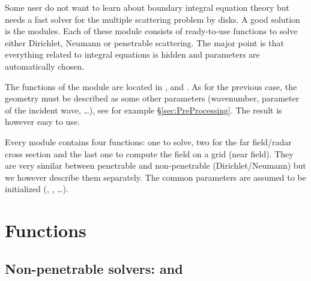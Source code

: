 \label{chap:Solver}
Some user do not want to learn about boundary integral equation theory but needs a fast solver for the multiple scattering problem by disks. A good solution is the \mudiff {} modules. Each of these module consists of ready-to-use functions to solve either Dirichlet, Neumann or penetrable scattering. The major point is that everything related to integral equations is hidden and parameters are automatically chosen.

The functions of the  module are located in ,  and . As for the previous case, the geometry must be described as some other parameters (wavenumber, parameter of the incident wave, \ldots), see for example \S\ref{sec:PreProcessing}. The result is however easy to use.

Every  module contains four functions: one to solve, two for the far field/radar cross section and the last one to compute the field on a grid (near field). They are very similar between penetrable and non-penetrable (Dirichlet/Neumann) but we however describe them separately. The common parameters are assumed to be initialized (, , \ldots).

\section{Functions}
\subsection{Non-penetrable solvers: \DirichletSolver and \NeumannSolver}
\label{secFun:DirichletSolver}
\label{secFun:NeumannSolver}

